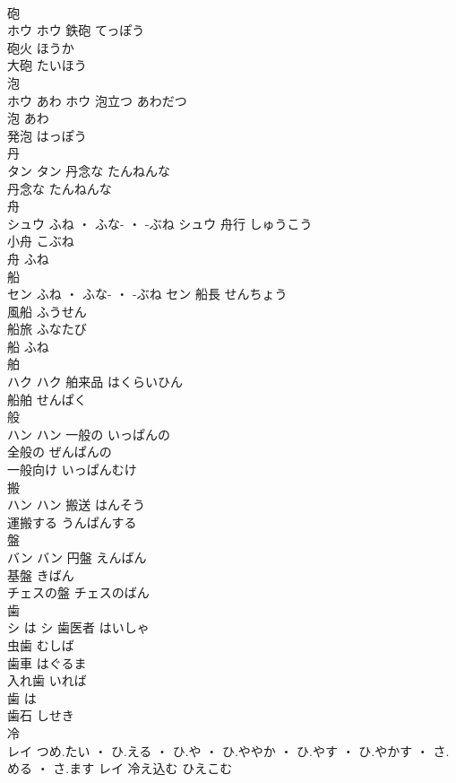 \documentclass[8pt]{extreport}
\begin{document}
\begin{CJK}{UTF8}{min}
\\	砲	
\\	ホウ		ホウ	鉄砲	てっぽう	
\\	砲火	ほうか	
\\	大砲	たいほう	
\\	泡	
\\	ホウ	あわ	ホウ	泡立つ	あわだつ	
\\	泡	あわ	
\\	発泡	はっぽう	
\\	丹	
\\	タン		タン	丹念な	たんねんな	
\\	丹念な	たんねんな	
\\	舟	
\\	シュウ	ふね ・ ふな- ・ -ぶね	シュウ	舟行	しゅうこう	
\\	小舟	こぶね	
\\	舟	ふね	
\\	船	
\\	セン	ふね ・ ふな- ・ -ぶね	セン	船長	せんちょう	
\\	風船	ふうせん	
\\	船旅	ふなたび	
\\	船	ふね	
\\	舶	
\\	ハク		ハク	舶来品	はくらいひん	
\\	船舶	せんぱく	
\\	般	
\\	ハン		ハン	一般の	いっぱんの	
\\	全般の	ぜんぱんの	
\\	一般向け	いっぱんむけ	
\\	搬	
\\	ハン		ハン	搬送	はんそう	
\\	運搬する	うんぱんする	
\\	盤	
\\	バン		バン	円盤	えんばん	
\\	基盤	きばん	
\\	チェスの盤	チェスのばん	
\\	歯	
\\	シ	は	シ	歯医者	はいしゃ	
\\	虫歯	むしば	
\\	歯車	はぐるま	
\\	入れ歯	いれば	
\\	歯	は	
\\	歯石	しせき	
\\	冷	
\\	レイ	つめ.たい ・ ひ.える ・ ひ.や ・ ひ.ややか ・ ひ.やす ・ ひ.やかす ・ さ.める ・ さ.ます	レイ	冷え込む	ひえこむ	

\end{CJK}
\end{document}
